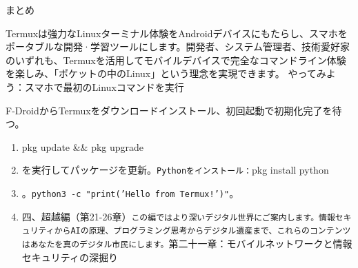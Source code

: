 
まとめ

\begin{tcbinfo}{Termuxは強力なLinuxターミナル体験をAndroidデバイスにもたらし、スマホをポータブルな開発·学習ツールにします。開発者、システム管理者、技術愛好家のいずれも、Termuxを活用してモバイルデバイスで完全なコマンドライン体験を楽しみ、「ポケットの中のLinux」という理念を実現できます。}
やってみよう：スマホで最初のLinuxコマンドを実行

\end{tcbinfo}

\begin{tcbpractice}{F-DroidからTermuxをダウンロードインストール、初回起動で初期化完了を待つ。}
\begin{enumerate}
  \item pkg update \&\& pkg upgrade
  \item を実行してパッケージを更新。\texttt{Pythonをインストール：}pkg install python
  \item 。\texttt{python3 -\allowbreak c "print('Hello from Termux!')"}。
  \item 四、超越編（第21-26章）\texttt{この編ではより深いデジタル世界にご案内します。情報セキュリティからAIの原理、プログラミング思考からデジタル遺産まで、これらのコンテンツはあなたを真のデジタル市民にします。}第二十一章：モバイルネットワークと情報セキュリティの深掘り
\end{enumerate}

\end{tcbpractice}
